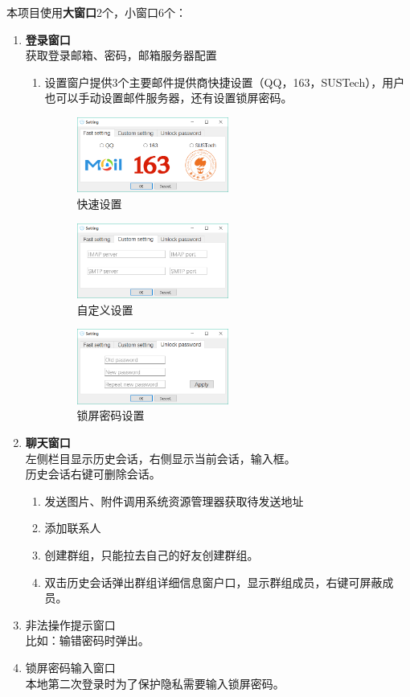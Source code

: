 \documentclass[a4paper,UTF8]{article}
\begin{document}
本项目使用\textbf{大窗口}2个，小窗口6个：
\begin{enumerate}
	\item \textbf{登录窗口}
	\\获取登录邮箱、密码，邮箱服务器配置
	\begin{enumerate}
		\item 设置窗户提供3个主要邮件提供商快捷设置（QQ，163，SUSTech），用户也可以手动设置邮件服务器，还有设置锁屏密码。
		\begin{figure}[H]
			\centering
			\includegraphics[width=0.5\textwidth]{UI3.png} 
			\caption{快速设置}
			\label{fig:Config_fast}
		\end{figure}
		\begin{figure}[H]
			\centering
			\includegraphics[width=0.5\textwidth]{UI4.png} 
			\caption{自定义设置}
			\label{fig:Config_custom}
		\end{figure}
		\begin{figure}[H]
			\centering
			\includegraphics[width=0.5\textwidth]{UI5.png} 
			\caption{锁屏密码设置}
			\label{fig:Config_lockpwd}
		\end{figure}
	\end{enumerate}
	\item \textbf{聊天窗口}
	\\ 左侧栏目显示历史会话，右侧显示当前会话，输入框。
	\\ 历史会话右键可删除会话。
	\begin{enumerate}
		\item 发送图片、附件调用系统资源管理器获取待发送地址
		\item 添加联系人
		\item 创建群组，只能拉去自己的好友创建群组。
		\item 双击历史会话弹出群组详细信息窗户口，显示群组成员，右键可屏蔽成员。
	\end{enumerate}
	\item 非法操作提示窗口
	\\比如：输错密码时弹出。
	\item 锁屏密码输入窗口
	\\本地第二次登录时为了保护隐私需要输入锁屏密码。
\end{enumerate}
\end{document}
